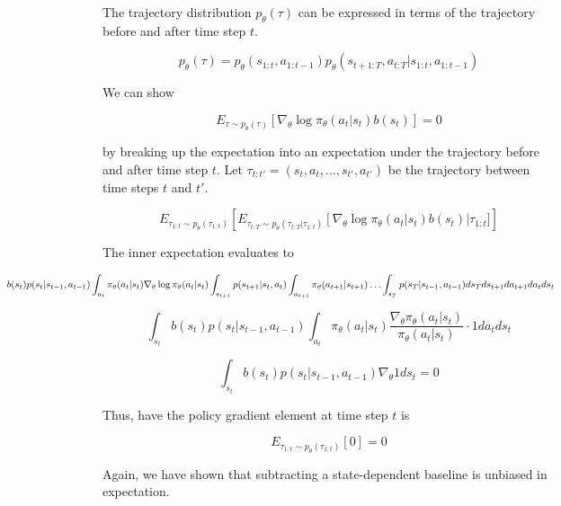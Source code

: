 \documentclass{article}
\begin{document}
    The trajectory distribution $p_\theta(\tau)$ can be expressed in terms of the 
    trajectory before and after time step $t$.

    \begin{equation*}
        p_\theta(\tau) = p_\theta(s_{1:t}, a_{1:t-1})p_\theta(s_{t+1:T}, a_{t:T} | s_{1:t}, a_{1:t-1})
    \end{equation*}

    We can show

    \begin{equation*}
       E_{\tau\sim p_\theta(\tau)} \left[\nabla_\theta \log \pi_\theta(a_t|s_t) b(s_t)\right] = 0
     \end{equation*}

     by breaking up the expectation into an expectation under the trajectory before and after time step $t$. Let 
     $\tau_{t:t'} = (s_t,a_t, ..., s_{t'},a_{t'})$ be the trajectory between time steps $t$ and $t'$. 

    \begin{equation*}
        E_{\tau_{1:t}\sim p_\theta(\tau_{1:t})} \left[ E_{\tau_{t:T}\sim p_\theta(\tau_{t:T} | \tau_{1:t})} \left[\nabla_\theta \log \pi_\theta(a_t|s_t) b(s_t)\right | \tau_{1:t}]\right]
    \end{equation*}

    The inner expectation evaluates to 

    \begin{equation*}
        \hspace*{-4cm}
        \int_{s_t} b(s_t) p(s_t | s_{t-1}, a_{t-1}) \int_{a_t} \pi_\theta(a_t|s_t) \nabla_\theta \log \pi_\theta(a_t|s_t) \int_{s_{t+1}} p(s_{t+1} | s_t, a_t) \int_{a_{t+1}}\pi_\theta(a_{t+1}|s_{t+1}) \ldots \int_{s_T} p(s_T|s_{t-1},a_{t-1})  ds_T ds_{t+1} da_{t+1} da_t ds_t    
    \end{equation*}

    \begin{equation*}
        \int_{s_t} b(s_t) p(s_t | s_{t-1}, a_{t-1}) \int_{a_t} \pi_\theta (a_t|s_t) \frac{\nabla_\theta \pi_\theta(a_t|s_t)}{\pi_\theta(a_t|s_t)}  \cdot 1 da_t ds_t
    \end{equation*}


    \begin{equation*}
        \int_{s_t} b(s_t) p(s_t | s_{t-1}, a_{t-1}) \nabla_\theta 1 ds_t = 0
    \end{equation*}

    Thus, have the policy gradient element at time step $t$ is 
    
    \begin{equation*}
        E_{\tau_{1:t}\sim p_\theta(\tau_{1:t})} \left[ 0\right] = 0
    \end{equation*}

    Again, we have shown that subtracting a state-dependent baseline is unbiased
    in expectation.
\end{document}
